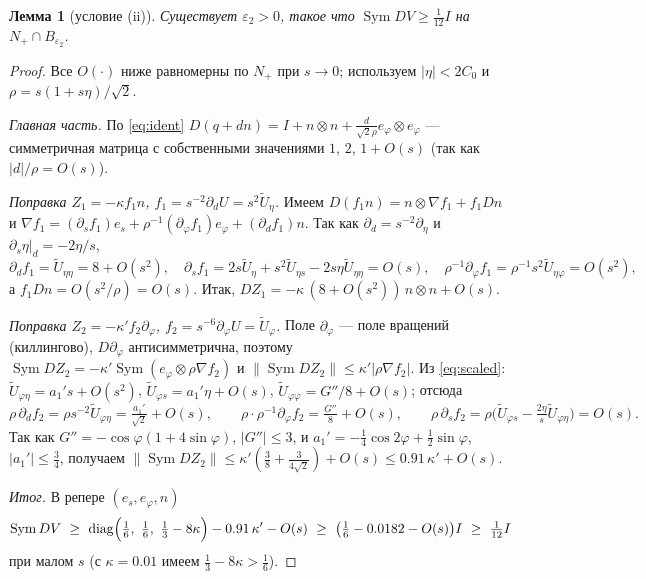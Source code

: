 \documentclass[11pt,a4paper]{article}
\newtheorem{lemma}{Лемма}
\theoremstyle{definition}
\newcommand{\eps}{\varepsilon}
\DeclareMathOperator{\Sym}{Sym}
\DeclareMathOperator{\diag}{diag}
\newcommand{\tU}{\widetilde U}
\begin{document}
\begin{lemma}[условие (ii)]\label{lem:ii}
Существует $\eps_2>0$, такое что $\Sym DV\ge\frac1{12}I$ на $N_+\cap B_{\eps_2}$.
\end{lemma}
\begin{proof}
Все $O(\cdot)$ ниже равномерны по $N_+$ при $s\to0$; используем $|\eta|<2C_0$ и $\rho=s(1+s\eta)/\sqrt2$.

\emph{Главная часть.} По \eqref{eq:ident} $D(q+dn)=I+n\otimes n+\frac{d}{\sqrt2\rho}e_\varphi\otimes e_\varphi$ --- симметричная
матрица с собственными значениями $1$, $2$, $1+O(s)$ (так как $|d|/\rho=O(s)$).

\emph{Поправка $Z_1=-\kappa f_1n$, $f_1=s^{-2}\partial_dU=s^2\tU_\eta$.} Имеем $D(f_1n)=n\otimes\nabla f_1+f_1Dn$ и
$\nabla f_1=(\partial_sf_1)e_s+\rho^{-1}(\partial_\varphi f_1)e_\varphi+(\partial_df_1)n$. Так как $\partial_d=s^{-2}\partial_\eta$ и
$\partial_s\eta|_d=-2\eta/s$,
\[
\partial_df_1=\tU_{\eta\eta}=8+O(s^2),\quad
\partial_sf_1=2s\tU_\eta+s^2\tU_{\eta s}-2s\eta\tU_{\eta\eta}=O(s),\quad
\rho^{-1}\partial_\varphi f_1=\rho^{-1}s^2\tU_{\eta\varphi}=O(s^2),
\]
а $f_1Dn=O(s^2/\rho)=O(s)$. Итак, $DZ_1=-\kappa\,(8+O(s^2))\,n\otimes n+O(s)$.

\emph{Поправка $Z_2=-\kappa' f_2\partial_\varphi$, $f_2=s^{-6}\partial_\varphi U=\tU_\varphi$.} Поле $\partial_\varphi$ --- поле вращений
(киллингово), $D\partial_\varphi$ антисимметрична, поэтому $\Sym DZ_2=-\kappa'\Sym(e_\varphi\otimes\rho\nabla f_2)$ и
$\|\Sym DZ_2\|\le\kappa'|\rho\nabla f_2|$. Из \eqref{eq:scaled}: $\tU_{\varphi\eta}=a_1's+O(s^2)$, $\tU_{\varphi s}=a_1'\eta+O(s)$,
$\tU_{\varphi\varphi}=G''/8+O(s)$; отсюда
\[
\rho\,\partial_df_2=\rho s^{-2}\tU_{\varphi\eta}=\tfrac{a_1'}{\sqrt2}+O(s),\qquad
\rho\cdot\rho^{-1}\partial_\varphi f_2=\tfrac{G''}{8}+O(s),\qquad
\rho\,\partial_sf_2=\rho\bigl(\tU_{\varphi s}-\tfrac{2\eta}{s}\tU_{\varphi\eta}\bigr)=O(s).
\]
Так как $G''=-\cos\varphi(1+4\sin\varphi)$, $|G''|\le3$, и $a_1'=-\frac14\cos2\varphi+\frac12\sin\varphi$, $|a_1'|\le\frac34$, получаем
$\|\Sym DZ_2\|\le\kappa'(\frac38+\frac{3}{4\sqrt2})+O(s)\le0.91\,\kappa'+O(s)$.

\emph{Итог.} В репере $(e_s,e_\varphi,n)$
\[
\Sym DV\ \ge\ \diag\Bigl(\tfrac16,\ \tfrac16,\ \tfrac13-8\kappa\Bigr)-0.91\,\kappa'-O(s)
\ \ge\ \bigl(\tfrac16-0.0182-O(s)\bigr)I\ \ge\ \tfrac1{12}I
\]
при малом $s$ (с $\kappa=0.01$ имеем $\frac13-8\kappa>\frac16$).
\end{proof}
\end{document}
